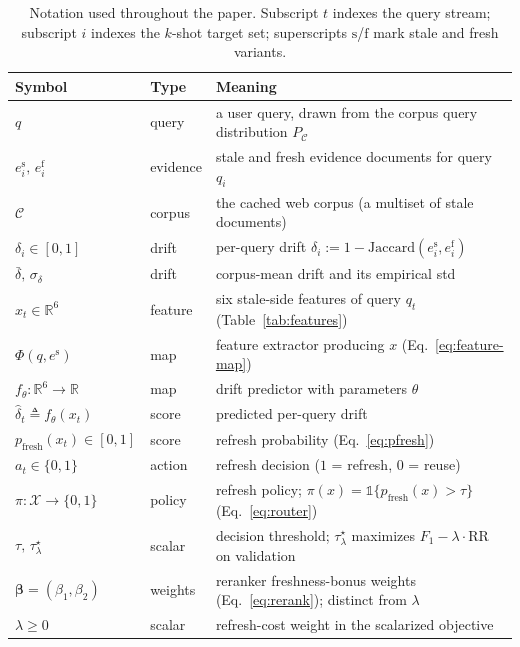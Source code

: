 \documentclass[pdflatex,sn-basic]{sn-jnl}
\begin{document}
\begin{table}[htbp]
\centering
\small
\caption{Notation used throughout the paper. Subscript $t$ indexes the query stream; subscript $i$ indexes the $k$-shot target set; superscripts $\mathrm{s}$/$\mathrm{f}$ mark stale and fresh variants.}
\label{tab:notation}
\centering
\renewcommand{\arraystretch}{1.05}
\begin{tabular}{llp{9.4cm}}
\toprule
Symbol & Type & Meaning \\
\midrule
$q$ & query & a user query, drawn from the corpus query distribution $P_{\mathcal{C}}$ \\
$e^{\mathrm{s}}_i,\, e^{\mathrm{f}}_i$ & evidence & stale and fresh evidence documents for query $q_i$ \\
$\mathcal{C}$ & corpus & the cached web corpus (a multiset of stale documents) \\
$\delta_i \in [0,1]$ & drift & per-query drift $\delta_i := 1 - \mathrm{Jaccard}(e^{\mathrm{s}}_i, e^{\mathrm{f}}_i)$ \\
$\bar\delta,\, \sigma_\delta$ & drift & corpus-mean drift and its empirical std \\
$x_t \in \mathbb{R}^{6}$ & feature & six stale-side features of query $q_t$ (Table~\ref{tab:features}) \\
$\Phi(q, e^{\mathrm{s}})$ & map & feature extractor producing $x$ (Eq.~\ref{eq:feature-map}) \\
$f_\theta : \mathbb{R}^{6} \to \mathbb{R}$ & map & drift predictor with parameters $\theta$ \\
$\hat\delta_t \triangleq f_\theta(x_t)$ & score & predicted per-query drift \\
$p_{\mathrm{fresh}}(x_t) \in [0,1]$ & score & refresh probability (Eq.~\ref{eq:pfresh}) \\
$a_t \in \{0,1\}$ & action & refresh decision ($1$ = refresh, $0$ = reuse) \\
$\pi : \mathcal{X} \to \{0,1\}$ & policy & refresh policy; $\pi(x) = \mathbb{1}\{p_{\mathrm{fresh}}(x) > \tau\}$ (Eq.~\ref{eq:router}) \\
$\tau,\, \tau^\star_\lambda$ & scalar & decision threshold; $\tau^\star_\lambda$ maximizes $F_1 - \lambda\cdot\mathrm{RR}$ on validation \\
$\boldsymbol\beta = (\beta_1, \beta_2)$ & weights & reranker freshness-bonus weights (Eq.~\ref{eq:rerank}); distinct from $\lambda$ \\
$\lambda \ge 0$ & scalar & refresh-cost weight in the scalarized objective \\

\end{tabular}
\end{table}
\end{document}
